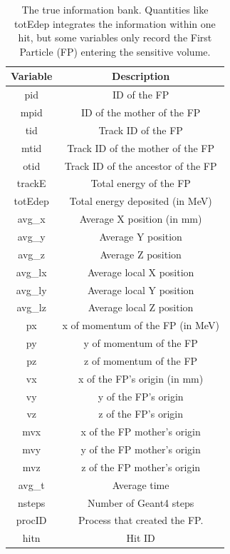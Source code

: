 \begin{table}[h]
	\small
	\begin{center}
		\begin{tabular}{| c | c |}
			\hline \hline
			Variable    & Description  \\
			\hline
				pid         &   ID of the FP                     \\
				mpid        &   ID of the mother of the FP \\
				tid         &   Track ID of the FP\\
				mtid        &   Track ID of the mother of the FP  \\
				otid        &   Track ID of the ancestor of the FP \\
				trackE      &   Total energy of the FP \\
				totEdep     &   Total energy deposited (in MeV) \\
				avg\_x      &   Average X position  (in mm) \\
				avg\_y      &   Average Y position  \\
				avg\_z      &   Average Z position  \\
				avg\_lx     &   Average local X position \\
				avg\_ly     &   Average local Y position \\
				avg\_lz     &   Average local Z position \\
				px          &   x  of momentum of the FP (in MeV) \\
				py          &   y  of momentum of the FP \\
				pz          &   z  of momentum of the FP \\
				vx          &   x  of the FP's origin (in mm) \\
				vy          &   y  of the FP's origin \\
				vz          &   z  of the FP's origin \\
				mvx         &   x  of the FP mother's origin\\
				mvy         &   y  of the FP mother's origin \\
				mvz         &   z  of the FP mother's origin \\
				avg\_t      &   Average time \\
				nsteps      &   Number of Geant4 steps \\
				procID      &   Process that created the FP.  \\
				hitn        &   Hit ID \\
			\hline \hline
		\end{tabular}
	\end{center}
	\caption{The true information bank. Quantities like totEdep integrates the information within one hit, but some
             variables only record the First Particle (FP) entering the sensitive volume.}\label{tab:trueInformation}
\end{table}


